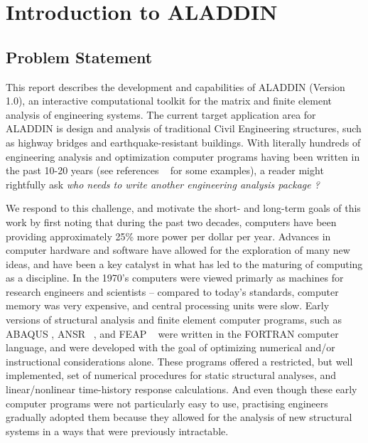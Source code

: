 
\chapter{Introduction to ALADDIN}

\section{Problem Statement}

\vspace{0.15 in}
\noindent\hspace{0.5 in}
This report describes the development and capabilities of ALADDIN (Version 1.0),
an interactive computational toolkit for the matrix
and finite element analysis of engineering systems.
The current target application area for ALADDIN is
design and analysis of traditional Civil Engineering structures,
such as highway bridges and earthquake-resistant buildings.
With literally hundreds of engineering analysis and
optimization computer programs having been written in the past 10-20 years (see
references ~\cite{abaqus92,balling83,mondkar75,nye87,nye82,nye86,wu86,zienkiewitz89}
for some examples), a reader might rightfully
ask {\it who needs to write another engineering analysis package ?}

\vspace{0.15 in}
\noindent\hspace{0.5 in}
We respond to this challenge, and motivate the short- and long-term goals of
this work by first noting that during the past two decades,
computers have been providing approximately 25\% more power per dollar per year.
Advances in computer hardware and software have allowed for
the exploration of many new ideas, and have been a key catalyst in
what has led to the maturing of computing as a discipline.
In the 1970's computers were viewed primarly as
machines for research engineers and scientists -- compared to today's standards,
computer memory was very expensive, and central processing units were slow.
Early versions of structural analysis and finite element computer programs,
such as ABAQUS \cite{abaqus92}, ANSR ~\cite {mondkar75},
and FEAP ~\cite{zienkiewitz89} were written in the FORTRAN computer language,
and were developed with the goal of optimizing
numerical and/or instructional considerations alone.
These programs offered a restricted, but well implemented,
set of numerical procedures for static structural analyses,
and linear/nonlinear time-history response calculations.
And even though these early computer programs were not particularly easy to use,
practising engineers gradually adopted them because they allowed for
the analysis of new structural systems in a ways that were previously intractable.

